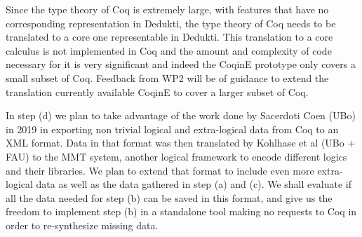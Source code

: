 Since the type theory of Coq is extremely large, with features that
have no corresponding representation in Dedukti, the type theory of
Coq needs to be translated to a core one representable in Dedukti.
This translation to a core calculus is not implemented in Coq and the
amount and complexity of code necessary for it is very significant and
indeed the CoqinE prototype only covers a small subset of
Coq. Feedback from WP2 will be of guidance to extend
the translation currently available CoqinE to cover a larger subset of
Coq.

In step (d) we plan to take advantage of the work done by Sacerdoti Coen (UBo)
in 2019 in exporting non trivial logical and extra-logical data from Coq to
an XML format. Data in that format was then translated by Kohlhase et al
(UBo + FAU) to the MMT system, another logical framework to encode different
logics and their libraries. We plan to extend that format to include even
more extra-logical data as well as the data gathered in step (a) and (c). We shall
evaluate if all the data needed for step (b) can be saved in this format, and
give us the freedom to implement step (b) in a standalone tool making no
requests to Coq in order to re-synthesize missing data.

